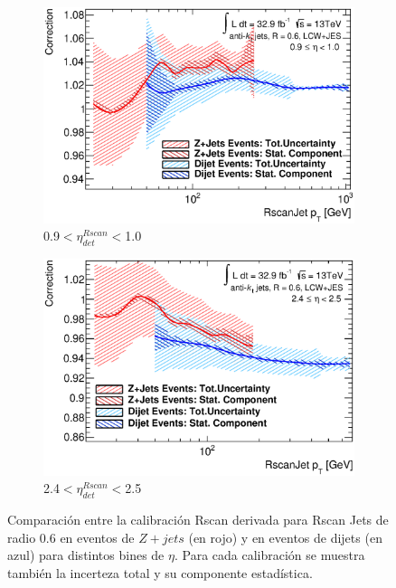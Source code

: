 \begin{figure}[ht]
\begin{subfigure}[b]{0.495\textwidth}
        \includegraphics[width=\textwidth]{images/ComparisonW_dijets_Eta_54.eps}
        \caption{0.9$<\eta^{Rscan}_{det}<$1.0}
        \label{fig:stat}
    \end{subfigure}
    \hfill
    \begin{subfigure}[b]{0.495\textwidth}
        \centering
        \includegraphics[width=\textwidth]{images/ComparisonW_dijets_Eta_69.eps}
        \caption{2.4$<\eta^{Rscan}_{det}<$2.5}
    \end{subfigure}
    \caption{ Comparación entre la calibración Rscan derivada para Rscan Jets de radio 0.6 en eventos de $Z+jets$ (en rojo) y en eventos de dijets (en azul) para distintos bines de $\eta$. Para cada calibración se muestra también la incerteza total y su componente estadística.} 
    \label{fig:Comparison}
\end{figure}









